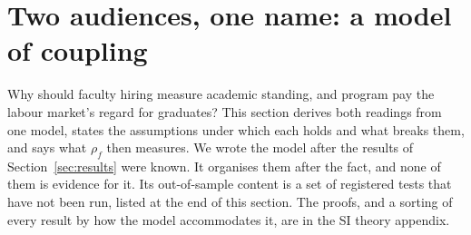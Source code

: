 \providecommand{\SItheory}{the SI theory appendix}
\section{Two audiences, one name: a model of coupling}\label{sec:theory}

Why should faculty hiring measure academic standing, and program pay the labour market's regard for
graduates? This section derives both readings from one model, states the assumptions under which each holds and
what breaks them, and says what $\rho_f$ then measures. We wrote the model after the results of
Section~\ref{sec:results} were known. It organises them after the fact, and none of them is evidence for it. Its
out-of-sample content is a set of registered tests that have not been run, listed at the end of this section.
The proofs, and a sorting of every result by how the model accommodates it, are in \SItheory.


